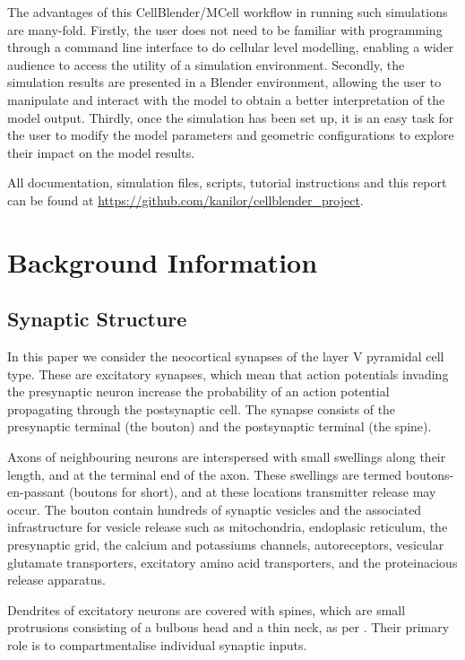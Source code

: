 \documentclass[a4paper]{article}
\begin{document}
The advantages of this CellBlender/MCell workflow in running such simulations are many-fold. Firstly, the user does not need to be familiar with programming through a command line interface to do cellular level modelling, enabling a wider audience to access the utility of a simulation environment. Secondly, the simulation results are presented in a Blender environment, allowing the user to manipulate and interact with the model to obtain a better interpretation of the model output. Thirdly, once the simulation has been set up, it is an easy task for the user to modify the model parameters and geometric configurations to explore their impact on the model results. 

All documentation, simulation files, scripts, tutorial instructions and this report can be found at \url{https://github.com/kanilor/cellblender_project}.

\section{Background Information}

\subsection{Synaptic Structure}
In this paper we consider the neocortical synapses of the layer V pyramidal cell type. These are excitatory synapses, which mean that action potentials invading the presynaptic neuron increase the probability of an action potential propagating through the postsynaptic cell. The synapse consists of the presynaptic terminal (the bouton) and the postsynaptic terminal (the spine). 

Axons of neighbouring neurons are interspersed with small swellings along their length, and at the terminal end of the axon. These swellings are termed boutons-en-passant (boutons for short), and at these locations transmitter release may occur. The bouton contain hundreds of synaptic vesicles and the associated infrastructure for vesicle release such as mitochondria, endoplasic reticulum, the presynaptic grid, the calcium and potassiums channels, autoreceptors, vesicular glutamate transporters, excitatory amino acid transporters, and the proteinacious release apparatus.

Dendrites of excitatory neurons are covered with spines, which are small protrusions consisting of a bulbous head and a thin neck, as per \cite{Arellano:FrontNeurosci:2007}. Their primary role is to compartmentalise individual synaptic inputs.
\end{document}
